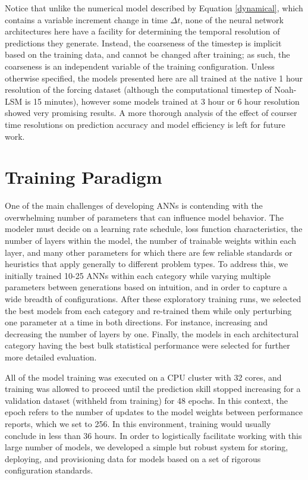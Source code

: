 Notice that unlike the numerical model described by Equation \ref{dynamical}, which contains a variable increment change in time $\Delta t$, none of the neural network architectures here have a facility for determining the temporal resolution of predictions they generate. Instead, the coarseness of the timestep is implicit based on the training data, and cannot be changed after training; as such, the coarseness is an independent variable of the training configuration. Unless otherwise specified, the models presented here are all trained at the native 1 hour resolution of the forcing dataset (although the computational timestep of Noah-LSM is 15 minutes), however some models trained at 3 hour or 6 hour resolution showed very promising results. A more thorough analysis of the effect of courser time resolutions on prediction accuracy and model efficiency is left for future work.

\section{Training Paradigm}

One of the main challenges of developing ANNs is contending with the overwhelming number of parameters that can influence model behavior. The modeler must decide on a learning rate schedule, loss function characteristics, the number of layers within the model, the number of trainable weights within each layer, and many other parameters for which there are few reliable standards or heuristics that apply generally to different problem types. To address this, we initially trained 10-25 ANNs within each category while varying multiple parameters between generations based on intuition, and in order to capture a wide breadth of configurations. After these exploratory training runs, we selected the best models from each category and re-trained them while only perturbing one parameter at a time in both directions. For instance, increasing and decreasing the number of layers by one. Finally, the models in each architectural category having the best bulk statistical performance were selected for further more detailed evaluation.

All of the model training was executed on a CPU cluster with 32 cores, and training was allowed to proceed until the prediction skill stopped increasing for a validation dataset (withheld from training) for 48 epochs. In this context, the epoch refers to the number of updates to the model weights between performance reports, which we set to 256. In this environment, training would usually conclude in less than 36 hours. In order to logistically facilitate working with this large number of models, we developed a simple but robust system for storing, deploying, and provisioning data for models based on a set of rigorous configuration standards.

